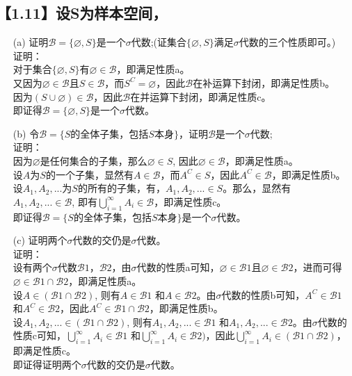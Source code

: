 \documentclass [12pt]{article}
\begin{document}
\begin{CJK*}{GBK}{kai}
\section{【1.11】设S为样本空间， }
\begin{enumerate}
  \item[(a)] 证明$\mathcal{B}=\{\varnothing,S\}$是一个$\sigma$代数;(证集合$\{\varnothing,S\}$满足$\sigma$代数的三个性质即可。)\\
  证明：\\对于集合$\{\varnothing,S\}$有$\varnothing \in \mathcal{B}$，即满足性质a。\\
  又因为$\varnothing \in \mathcal{B}$且$S \in \mathcal{B}$，而$S^{C}=\varnothing$，因此$\mathcal{B}$在补运算下封闭，即满足性质b。\\
  因为$(S \cup \varnothing) \in \mathcal{B}$，因此$\mathcal{B}$在并运算下封闭，即满足性质c。\\
  即证得$\mathcal{B}=\{\varnothing,S\}$是一个$\sigma$代数。
  \item[(b)] 令$\mathcal{B}=\{S的全体子集，包括S本身\}$，证明$\mathcal{B}$是一个$\sigma$代数;\\
  证明：\\因为$\varnothing$是任何集合的子集，那么$\varnothing \in S$, 因此$\varnothing \in \mathcal{B}$，即满足性质a。\\
  设$A$为$S$的一个子集，显然有$A \in \mathcal{B}$，而$A^{C} \in S$，因此$A^{C} \in \mathcal{B}$，即满足性质b。\\
  设$A_{1}, A_{2},...  $为$S$的所有的子集，有，$A_{1}, A_{2},...  \in S$。那么，显然有$A_{1}, A_{2},...  \in \mathcal{B}$, 即有$\bigcup\limits_{i=1}^{\infty}A_i \in \mathcal{B}$，即满足性质c。\\
   即证得$\mathcal{B}=\{S的全体子集，包括S本身\}$是一个$\sigma$代数。
  \item[(c)] 证明两个$\sigma$代数的交仍是$\sigma$代数。\\
  证明：\\设有两个$\sigma$代数$\mathcal{B}1$，$\mathcal{B}2$，由$\sigma$代数的性质a可知，$\varnothing \in \mathcal{B}1$且$\varnothing \in \mathcal{B}2$，进而可得$\varnothing \in \mathcal{B}1 \cap \mathcal{B}2$，即满足性质a。\\
  设$A \in (\mathcal{B}1 \cap \mathcal{B}2 )$, 则有$A \in \mathcal{B}1 $ 和$A \in \mathcal{B}2 $。由$\sigma$代数的性质b可知，$A^{C} \in \mathcal{B} 1$ 和$A^{C} \in \mathcal{B}2 $，因此$A^{C} \in \mathcal{B}1 \cap \mathcal{B}2 $，即满足性质b。\\
  设$A_{1}, A_{2},...  \in (\mathcal{B}1 \cap \mathcal{B}2 )$, 则有$A_{1}, A_{2},...  \in \mathcal{B}1 $ 和$A_{1}, A_{2},...  \in \mathcal{B}2 $。由$\sigma$代数的性质c可知，$\bigcup\limits_{i=1}^{\infty}A_i \in \mathcal{B}1 $ 和$\bigcup\limits_{i=1}^{\infty}A_i \in \mathcal{B}2 )$，因此$\bigcup\limits_{i=1}^{\infty}A_i \in (\mathcal{B}1 \cap \mathcal{B}2 )$，即满足性质c。\\
  即证得证明两个$\sigma$代数的交仍是$\sigma$代数。
 \end{enumerate}
   

\end{CJK*}
\end{document}
